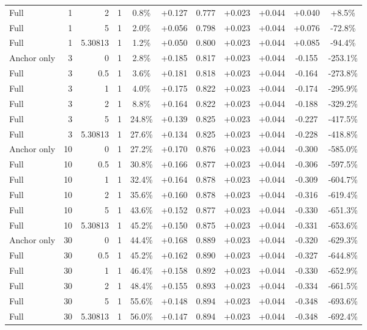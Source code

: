 \begin{table}[htbp]
\begin{tabular}{lrrrccccccc}
Full & 1 & 2 & 1 & 0.8\% & +0.127 & 0.777 & +0.023 & +0.044 & +0.040 & +8.5\% \\
Full & 1 & 5 & 1 & 2.0\% & +0.056 & 0.798 & +0.023 & +0.044 & +0.076 & -72.8\% \\
Full & 1 & 5.30813 & 1 & 1.2\% & +0.050 & 0.800 & +0.023 & +0.044 & +0.085 & -94.4\% \\
Anchor only & 3 & 0 & 1 & 2.8\% & +0.185 & 0.817 & +0.023 & +0.044 & -0.155 & -253.1\% \\
Full & 3 & 0.5 & 1 & 3.6\% & +0.181 & 0.818 & +0.023 & +0.044 & -0.164 & -273.8\% \\
Full & 3 & 1 & 1 & 4.0\% & +0.175 & 0.822 & +0.023 & +0.044 & -0.174 & -295.9\% \\
Full & 3 & 2 & 1 & 8.8\% & +0.164 & 0.822 & +0.023 & +0.044 & -0.188 & -329.2\% \\
Full & 3 & 5 & 1 & 24.8\% & +0.139 & 0.825 & +0.023 & +0.044 & -0.227 & -417.5\% \\
Full & 3 & 5.30813 & 1 & 27.6\% & +0.134 & 0.825 & +0.023 & +0.044 & -0.228 & -418.8\% \\
Anchor only & 10 & 0 & 1 & 27.2\% & +0.170 & 0.876 & +0.023 & +0.044 & -0.300 & -585.0\% \\
Full & 10 & 0.5 & 1 & 30.8\% & +0.166 & 0.877 & +0.023 & +0.044 & -0.306 & -597.5\% \\
Full & 10 & 1 & 1 & 32.4\% & +0.164 & 0.878 & +0.023 & +0.044 & -0.309 & -604.7\% \\
Full & 10 & 2 & 1 & 35.6\% & +0.160 & 0.878 & +0.023 & +0.044 & -0.316 & -619.4\% \\
Full & 10 & 5 & 1 & 43.6\% & +0.152 & 0.877 & +0.023 & +0.044 & -0.330 & -651.3\% \\
Full & 10 & 5.30813 & 1 & 45.2\% & +0.150 & 0.875 & +0.023 & +0.044 & -0.331 & -653.6\% \\
Anchor only & 30 & 0 & 1 & 44.4\% & +0.168 & 0.889 & +0.023 & +0.044 & -0.320 & -629.3\% \\
Full & 30 & 0.5 & 1 & 45.2\% & +0.162 & 0.890 & +0.023 & +0.044 & -0.327 & -644.8\% \\
Full & 30 & 1 & 1 & 46.4\% & +0.158 & 0.892 & +0.023 & +0.044 & -0.330 & -652.9\% \\
Full & 30 & 2 & 1 & 48.4\% & +0.155 & 0.893 & +0.023 & +0.044 & -0.334 & -661.5\% \\
Full & 30 & 5 & 1 & 55.6\% & +0.148 & 0.894 & +0.023 & +0.044 & -0.348 & -693.6\% \\
Full & 30 & 5.30813 & 1 & 56.0\% & +0.147 & 0.894 & +0.023 & +0.044 & -0.348 & -692.4\% \\

\end{tabular}
\end{table}
